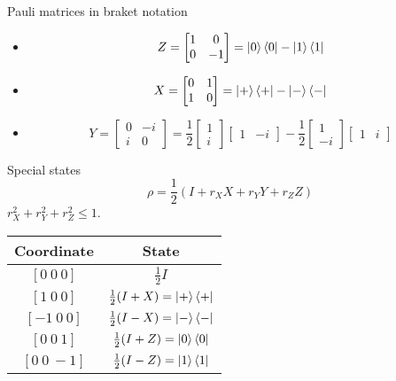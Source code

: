 \documentclass{beamer}
\begin{document}
\begin{frame}{Pauli matrices in braket notation}
\begin{itemize}
\setlength{\itemsep}{3em}
\item 
\begin{equation*}
Z=\begin{bmatrix}1&0\\0&-1\end{bmatrix}=
\ket{0}\bra{0}
-\ket{1}\bra{1}
\end{equation*}
\item 
\begin{equation*}
X=\begin{bmatrix}0&1\\1&0\end{bmatrix}=
\ket{+}\bra{+}
-\ket{-}\bra{-}
\end{equation*}
\item 
\begin{equation*}
Y=\begin{bmatrix}0&-i\\i&0\end{bmatrix}=
\frac12\begin{bmatrix}1\\i\end{bmatrix}\begin{bmatrix}1&-i\end{bmatrix}
-\frac12\begin{bmatrix}1\\-i\end{bmatrix}\begin{bmatrix}1&i\end{bmatrix}
\end{equation*}
\end{itemize}
\end{frame}

\begin{frame}{Special states}
\begin{equation*}
\rho = \frac12\left(I + r_X X + r_Y Y + r_Z Z\right)
\end{equation*}
\centering
$r_X^2+r_Y^2+r_Z^2\le 1$.

\vspace{1em}
\renewcommand{\arraystretch}{1.5}
\begin{tabular}{|c|c|}
\hline
Coordinate & State\\
\hline
$[0\ 0\ 0]$ & $\frac12 I$\\
$[1\ 0\ 0]$ & $\frac12 (I+X)=\ket{+}\bra{+}$\\
$[-1\ 0\ 0]$ & $\frac12 (I-X)=\ket{-}\bra{-}$\\
$[0\ 0\ 1]$ & $\frac12 (I+Z)=\ket{0}\bra{0}$\\
$[0\ 0\ -1]$ & $\frac12 (I-Z)=\ket{1}\bra{1}$\\
\hline
\end{tabular}
\end{frame}
\end{document}
